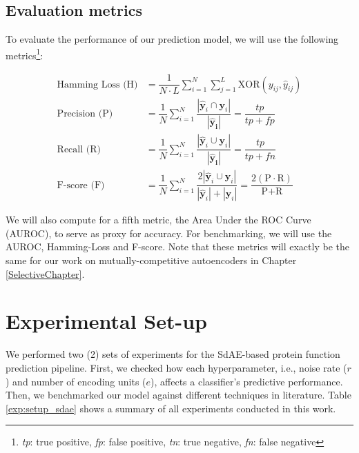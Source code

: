 \newpage
\subsection{Evaluation metrics}

To evaluate the performance of our prediction model, we will use the following
metrics\footnote[2]{\textit{tp}: true positive, \textit{fp}: false positive,
\textit{tn}: true negative, \textit{fn}: false negative}:

\begin{align}
    \text{Hamming Loss (H)} &= \dfrac{1}{N \cdot L} \sum_{i=1}^{N} \sum_{j=1}^{L}
    \text{XOR}(y_{ij}, \widehat{y}_{ij}) \\
    \text{Precision (P)} &=
    \dfrac{1}{N}\sum_{i=1}^{N}\dfrac{|\mathbf{\widehat{y}}_{i} \cap
    \mathbf{y}_{i}|}{|\mathbf{\widehat{y}_{i}}|} = \dfrac{tp}{tp + fp} \\
    \text{Recall (R)} &=
    \dfrac{1}{N}\sum_{i=1}^{N}\dfrac{|\mathbf{\widehat{y}}_{i} \cup
    \mathbf{y}_{i}|}{|\mathbf{\widehat{y}_{i}}|} = \dfrac{tp}{tp + fn} \\
    \text{F-score (F)} &=
    \dfrac{1}{N}\sum_{i=1}^{N} \dfrac{2 | \mathbf{\widehat{y}}_{i} \cup
        \mathbf{y}_{i}|}{|\mathbf{\widehat{y}}_{i} | + |\mathbf{y}_{i}|} =
        \dfrac{2 (\text{P} \cdot \text{R})}{\text{P} +
        \text{R}}
\end{align}

\par We will also compute for a fifth metric, the Area Under the ROC Curve
(AUROC), to serve as proxy for accuracy. For benchmarking, we will use the AUROC,
Hamming-Loss and F-score. Note that these metrics will exactly be the same for
our work on mutually-competitive autoencoders in Chapter \ref{SelectiveChapter}.

\section{Experimental Set-up}
\label{SDSetup}

\par We performed two (2) sets of experiments for the SdAE-based protein
function prediction pipeline. First, we checked how each hyperparameter,
i.e., noise rate ($r$) and number of encoding units ($e$), affects a
classifier's predictive performance. Then, we benchmarked our model against
different techniques in literature. Table \ref{exp:setup_sdae}
shows a summary of all experiments conducted in this work.

